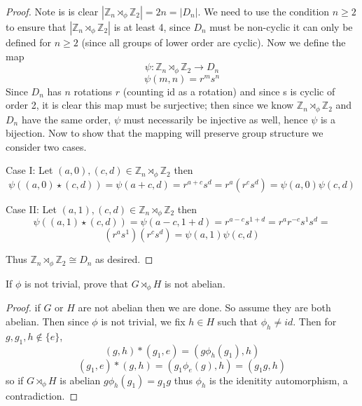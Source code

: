 \documentclass[11pt]{homework}
\newcommand{\Z}{\mathbb{Z}}
\newcommand{\semi}{\rtimes_\phi}
\begin{document}
\begin{proof}
    Note is is clear $|\Z_n \semi \Z_2| = 2n = |D_n|$. We need to use the condition $n \geq 2$ to 
    ensure that $|\Z_n \semi \Z_2|$ is at least 4, since $D_n$ must be non-cyclic it can only be defined
    for $n \geq 2$ (since all groups of lower order are cyclic). Now we define the map 
    \[ \psi : \Z_n \semi \Z_2 \to D_n \]
    \[ \psi(m,n) = r^m s^n \] 
    Since $D_n$ has $n$ rotations $r$ (counting id as a rotation) and since s is cyclic of order 2, it is 
    clear this map must be surjective; then since we know $\Z_n \semi \Z_2$ and $D_n$ have the same order, 
    $\psi$ must necessarily be injective as well, hence $\psi$ is a bijection. Now to show that the mapping 
    will preserve group structure we consider two cases.
    
    Case I: 
    Let $(a, 0), (c, d) \in \Z_n \semi \Z_2$ then 
    \[\psi \left((a,0) \star (c, d) \right) = \psi (a + c, d) = r^{a + c} s^d = r^a (r^c s^d) = \psi(a, 0) \psi (c,d) \]

    Case II: 
    Let $(a, 1), (c, d) \in \Z_n \semi \Z_2$ then 
    \[\psi \left((a,1) \star (c, d) \right) = \psi (a - c, 1 + d) = r^{a - c} s^{1 + d} = r^a r^ {-c} s^{1}  s^{d} = \] 
    \[ (r^a s^1)  (r^c s^d) = \psi(a, 1) \psi (c,d)\]

    Thus $\Z_n \semi \Z_2 \cong D_n$ as desired. 
\end{proof}

\question
If $\phi$ is not trivial, prove that $G \semi H$ is not abelian. 

\begin{proof}
    if $G$ or $H$ are not abelian then we are done. So assume they are both abelian. Then since $\phi$ is not trivial, we fix 
    $h \in H$ such that $\phi_h \neq id$. Then for $g, g_1, h \notin \{e\}$,
    \[ (g, h) * (g_1, e) = (g \phi_h(g_1), h ) \] 
    \[ (g_1, e) * (g, h) = (g_1 \phi_e(g), h) = (g_1 g , h) \] 
    so if $G \semi H$ is abelian $g \phi_h(g_1) = g_1 g$ thus $\phi_h$ is the idenitity automorphism, a contradiction. 
    
\end{proof}
\end{document}
